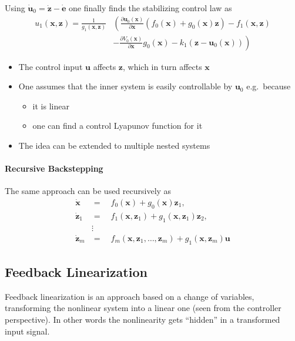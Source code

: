 Using $\dot{\mathbf{u}}_0=\dot{\mathbf{z}}-\dot{\mathbf{e}}$ one finally finds the stabilizing control law as
\begin{align*}
    u_1(\mathbf{x},\mathbf{z})  = \frac{1}{g_1(\mathbf{x},\mathbf{z})} & \left(\frac{\partial \mathbf{u}_0(\mathbf{x})}{\partial \mathbf{x}}\left(f_0(\mathbf{x})+g_0(\mathbf{x})\mathbf{z}\right)-f_1(\mathbf{x},\mathbf{z}) \right. \\
                                   & \left. -\frac{\partial V_0(\mathbf{x})}{\partial \mathbf{x}}g_0(\mathbf{x})-k_1(\mathbf{z}-\mathbf{u}_0(\mathbf{x}))\right)
\end{align*}

\newpar{}

\begin{itemize}
    \item The control input $\mathbf{u}$ affects $\mathbf{z}$, which in turn affects $\mathbf{x}$
    \item One assumes that the inner system is easily controllable by $\mathbf{u}_0$ e.g.\ because
          \begin{itemize}
              \item it is linear
              \item one can find a control Lyapunov function for it
          \end{itemize}
    \item The idea can be extended to multiple nested systems
\end{itemize}

\paragraph{Recursive Backstepping}
The same approach can be used recursively as
\begin{align*}
    \dot{\mathbf{x}}     & =\quad f_{0}(\mathbf{x})+g_{0}(\mathbf{x})\mathbf{z}_{1},                     \\
    \dot{\mathbf{z}}_{1} & =\quad f_{1}(\mathbf{x},\mathbf{z}_{1})+g_{1}(\mathbf{x},\mathbf{z}_{1})\mathbf{z}_{2},         \\
                & \vdots                                             \\
    \dot{\mathbf{z}}_{m} & =\quad f_{m}(\mathbf{x},\mathbf{z}_{1},\ldots,\mathbf{z}_{m})+g_{1}(\mathbf{x},\mathbf{z}_{m})\mathbf{u}
\end{align*}

\subsection{Feedback Linearization}
Feedback linearization is an approach based on a change of variables, transforming the nonlinear system into a linear one (seen from the controller perspective). In other words the nonlinearity gets ``hidden'' in a transformed input signal.


